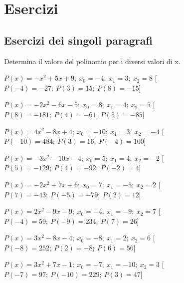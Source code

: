 
\section{Esercizi}

\subsection{Esercizi dei singoli paragrafi}

\begin{esercizio}\label{ese:}
 Determina il valore del polinomio per i diversi valori di x.
 \begin{enumeratea}
  \item  \(P(x)=- x^2 +5 x +9;~x_0=-4;~x_1=3;~x_2=8\)
   \hfill [\(P(-4)=-27;~P(3)=15;~P(8)=-15\)]
  \item  \(P(x)=-2 x^2 -6 x -5;~x_0=8;~x_1=4;~x_2=5\)
   \hfill [\(P(8)=-181;~P(4)=-61;~P(5)=-85\)]
  \item  \(P(x)=4 x^2 -8 x +4;~x_0=-10;~x_1=3;~x_2=-4\)
   \hfill [\(P(-10)=484;~P(3)=16;~P(-4)=100\)]
  \item  \(P(x)=-3 x^2 -10 x -4;~x_0=5;~x_1=4;~x_2=-2\)
   \hfill [\(P(5)=-129;~P(4)=-92;~P(-2)=4\)]
  \item  \(P(x)=-2 x^2 +7 x +6;~x_0=7;~x_1=-5;~x_2=2\)
   \hfill [\(P(7)=-43;~P(-5)=-79;~P(2)=12\)]
  \item  \(P(x)=2 x^2 -9 x -9;~x_0=-4;~x_1=-9;~x_2=7\)
   \hfill [\(P(-4)=59;~P(-9)=234;~P(7)=26\)]
  \item  \(P(x)=3 x^2 -8 x -4;~x_0=-8;~x_1=2;~x_2=6\)
   \hfill [\(P(-8)=252;~P(2)=-8;~P(6)=56\)]
  \item  \(P(x)=3 x^2 +7 x -1;~x_0=-7;~x_1=-10;~x_2=3\)
   \hfill [\(P(-7)=97;~P(-10)=229;~P(3)=47\)]
 \end{enumeratea}
\end{esercizio}
